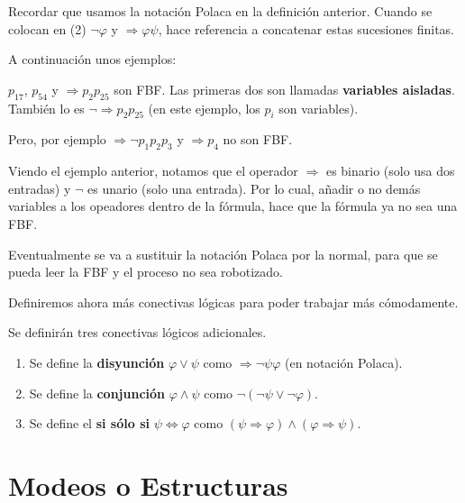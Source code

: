 \documentclass[12pt]{report}
\theoremstyle{largebreak}
\begin{document}
    \begin{obs}
        Recordar que usamos la notación Polaca en la definición anterior. Cuando se colocan en (2) $\neg\varphi$ y $\Rightarrow\varphi\psi$, hace referencia a concatenar estas sucesiones finitas.
    \end{obs}

    A continuación unos ejemplos:
    
    \begin{exa}
        $p_{17}$, $p_{54}$ y $\Rightarrow p_2p_{25}$ son FBF. Las primeras dos son llamadas \textbf{variables aisladas}. También lo es $\neg \Rightarrow p_2p_{25}$ (en este ejemplo, los $p_i$ son variables).

        Pero, por ejemplo $\Rightarrow \neg p_1 p_2 p_3$ y $\Rightarrow p_4$ no son FBF.
    \end{exa}

    Viendo el ejemplo anterior, notamos que el operador $\Rightarrow$ es binario (solo usa dos entradas) y $\neg$ es unario (solo una entrada). Por lo cual, añadir o no demás variables a los opeadores dentro de la fórmula, hace que la fórmula ya no sea una FBF.

    \begin{obs}
        Eventualmente se va a sustituir la notación Polaca por la normal, para que se pueda leer la FBF y el proceso no sea robotizado.
    \end{obs}

    Definiremos ahora más conectivas lógicas para poder trabajar más cómodamente.

    \begin{mydef}
        Se definirán tres conectivas lógicos adicionales.
        \begin{enumerate}
            \item Se define la \textbf{disyunción} $\varphi\lor\psi$ como $\Rightarrow\neg\psi\varphi$ (en notación Polaca).
            \item Se define la \textbf{conjunción} $\varphi\land\psi$ como $\neg(\neg\psi\lor\neg\varphi)$.
            \item Se define el \textbf{si sólo si} $\psi\iff\varphi$ como $(\psi\Rightarrow\varphi)\land(\varphi\Rightarrow\psi)$.
        \end{enumerate}
    \end{mydef}

    \section{Modeos o Estructuras}
\end{document}
